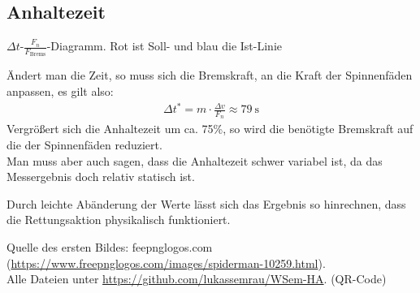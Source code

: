 \documentclass[a4paper, 11pt, nofonts, 
twoside, sfsidenotes, nobib, justified]{tufte-handout}
\begin{document}
\subsection{Anhaltezeit}
\begin{marginfigure}
	\centering
	\caption{$\Delta t$-$\frac{F_n}{F_\text{Brems}}$-Diagramm. Rot ist Soll- und blau die Ist-Linie}
\end{marginfigure}
Ändert man die Zeit, so muss sich die Bremskraft, an die Kraft der Spinnenfäden anpassen, es gilt also:
\begin{align*}
	\Delta t^* = m \cdot \frac{\Delta v}{F_n} \approx\SI{79}{\second}
\end{align*}
Vergrößert sich die Anhaltezeit um ca. 75\%, so wird die benötigte Bremskraft auf die der Spinnenfäden reduziert.\\
Man muss aber auch sagen, dass die Anhaltezeit schwer variabel ist, da das Messergebnis doch relativ statisch ist.
\begin{mdframed}[style = wichtig, frametitle = Fazit]
	Durch leichte Abänderung der Werte lässt sich das Ergebnis so hinrechnen, dass die Rettungsaktion physikalisch funktioniert.
\end{mdframed}
\printbibliography
{}
Quelle des ersten Bildes: feepnglogos.com (\url{https://www.freepnglogos.com/images/spiderman-10259.html}).\\ Alle Dateien unter \url{https://github.com/lukassemrau/WSem-HA}. (QR-Code)
\end{document}
